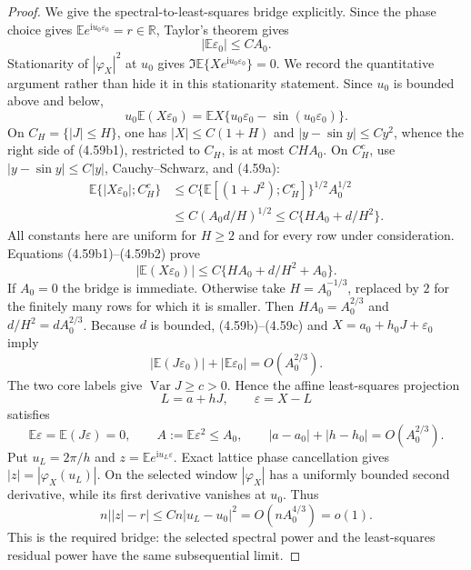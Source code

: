 \documentclass[11pt,a4paper]{article}
\numberwithin{equation}{section}
\theoremstyle{definition}
\theoremstyle{remark}
\newcommand{\E}{\mathbb E}
\newcommand{\ii}{\mathrm i}
\begin{document}
\begin{proof}
We give the spectral-to-least-squares bridge explicitly.  Since the phase
choice gives \(\E e^{\ii u_0\varepsilon_0}=r\in\mathbb R\), Taylor's
theorem gives
\[
 |\E\varepsilon_0|\le CA_0.                           \tag{4.59b}
\]
Stationarity of $|\varphi_X|^2$ at $u_0$ gives
$\Im\E\{Xe^{\ii u_0\varepsilon_0}\}=0$.  We record the quantitative
argument rather than hide it in this stationarity statement.  Since
$u_0$ is bounded above and below,
\[
 u_0\E(X\varepsilon_0)
 =\E X\{u_0\varepsilon_0-\sin(u_0\varepsilon_0)\}.    \tag{4.59b1}
\]
On $C_H=\{|J|\le H\}$, one has $|X|\le C(1+H)$ and
$|y-\sin y|\le Cy^2$, whence the right side of (4.59b1), restricted to
$C_H$, is at most $CHA_0$.  On $C_H^c$, use
$|y-\sin y|\le C|y|$, Cauchy--Schwarz, and (4.59a):
\[
\begin{split}
 \E\{|X\varepsilon_0|;C_H^c\}
 &\le C\{\E[(1+J^2);C_H^c]\}^{1/2}A_0^{1/2}\\
 &\le C(A_0d/H)^{1/2}
 \le C\{HA_0+d/H^2\}.
\end{split}                                           \tag{4.59b2}
\]
All constants here are uniform for $H\ge2$ and for every row under
consideration.  Equations (4.59b1)--(4.59b2) prove
\[
 |\E(X\varepsilon_0)|
 \le C\{HA_0+d/H^2+A_0\}.                            \tag{4.59c}
\]
If $A_0=0$ the bridge is immediate.  Otherwise take $H=A_0^{-1/3}$,
replaced by $2$ for the finitely many rows for which it is smaller.
Then $HA_0=A_0^{2/3}$ and $d/H^2=dA_0^{2/3}$.
Because $d$ is bounded, (4.59b)--(4.59c) and
$X=a_0+h_0J+\varepsilon_0$ imply
\[
 |\E(J\varepsilon_0)|+|\E\varepsilon_0|
       =O(A_0^{2/3}).                                  \tag{4.59d}
\]
The two core labels give $\operatorname {Var}J\ge c>0$.  Hence the affine
least-squares projection
\[
 L=a+hJ,\qquad \varepsilon=X-L
\]
satisfies
\[
 \E\varepsilon=\E(J\varepsilon)=0,\qquad
 A:=\E\varepsilon^2\le A_0,\qquad
 |a-a_0|+|h-h_0|=O(A_0^{2/3}).                        \tag{4.60a0}
\]
Put $u_L=2\pi/h$ and $z=\E e^{\ii u_L\varepsilon}$.  Exact lattice
phase cancellation gives $|z|=|\varphi_X(u_L)|$.  On the selected window
$|\varphi_X|$ has a uniformly bounded second derivative, while its first
derivative vanishes at $u_0$.  Thus
\[
 n\big||z|-r\big|
 \le Cn|u_L-u_0|^2
 =O(nA_0^{4/3})=o(1).                                  \tag{4.60}
\]
This is the required bridge: the selected spectral power and the
least-squares residual power have the same subsequential limit.


\end{proof}
\end{document}
